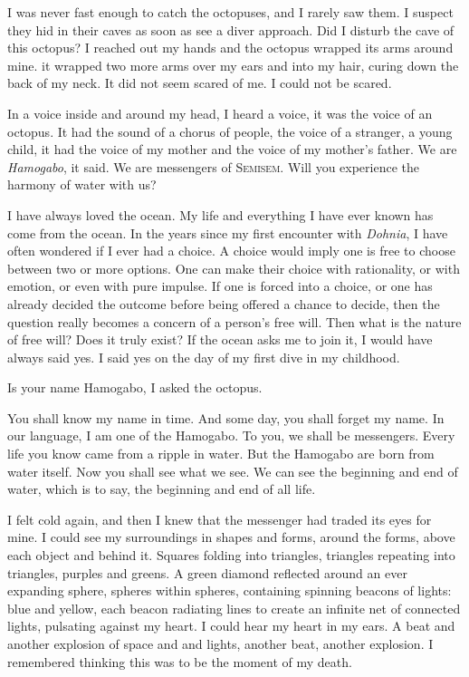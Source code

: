 \documentclass[12pt, letterpaper]{report}
\begin{document}
\vspace{1\baselineskip}
I was never fast enough to catch the octopuses, and I rarely saw them. I suspect they hid in their caves as soon as see a diver approach. Did I disturb the cave of this octopus? I reached out my hands and the octopus wrapped its arms around mine. it wrapped two more arms over my ears and into my hair, curing down the back of my neck. It did not seem scared of me. I could not be scared.

\vspace{1\baselineskip}
In a voice inside and around my head, I heard a voice, it was the voice of an octopus. It had the sound of a chorus of people, the voice of a stranger, a young child, it had the voice of my mother and the voice of my mother's father. We are \textit{Hamogabo}, it said. We are messengers of S\textsc{emisem}. Will you experience the harmony of water with us?

\vspace{1\baselineskip}
I have always loved the ocean. My life and everything I have ever known has come from the ocean. In the years since my first encounter with \textit{Dohnia}, I have often wondered if I ever had a choice. A choice would imply one is free to choose between two or more options. One can make their choice with rationality, or with emotion, or even with pure impulse. If one is forced into a choice, or one has already decided the outcome before being offered a chance to decide, then the question really becomes a concern of a person's free will. Then what is the nature of free will? Does it truly exist? If the ocean asks me to join it, I would have always said yes. I said yes on the day of my first dive in my childhood.

\vspace{1\baselineskip}
Is your name Hamogabo, I asked the octopus.

\vspace{1\baselineskip}
You shall know my name in time. And some day, you shall forget my name. In our language, I am one of the Hamogabo. To you, we shall be messengers. Every life you know came from a ripple in water. But the Hamogabo are born from water itself. Now you shall see what we see. We can see the beginning and end of water, which is to say, the beginning and end of all life.

\vspace{1\baselineskip}
I felt cold again, and then I knew that the messenger had traded its eyes for mine. I could see my surroundings in shapes and forms, around the forms, above each object and behind it. Squares folding into triangles, triangles repeating into triangles, purples and greens. A green diamond reflected around an ever expanding sphere, spheres within spheres, containing spinning beacons of lights: blue and yellow, each beacon radiating lines to create an infinite net of connected lights, pulsating against my heart. I could hear my heart in my ears. A beat and another explosion of space and and lights, another beat, another explosion. I remembered thinking this was to be the moment of my death.
\end{document}

